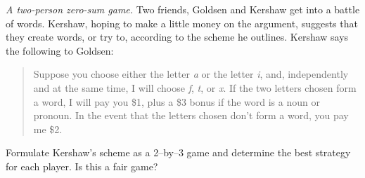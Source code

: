 \item \emph{A two-person zero-sum game.}
Two friends, Goldsen and Kershaw get into a battle of
  words. Kershaw, hoping to make a little money on the argument,
  suggests that they create words, or try to, according to the scheme
  he outlines. Kershaw says the following to Goldsen:

\begin{quote}
Suppose you choose either the letter \emph{a} or the letter
  \emph{i}, and, independently and at the same time, I will choose
  \emph{f}, \emph{t}, or \emph{x}. If the two letters chosen form a
  word, I will pay you \$1, plus a \$3 bonus if the word is a noun or
  pronoun. In the event that the letters chosen don't form a word, you
  pay me \$2.
\end{quote}

Formulate Kershaw's scheme as a 2--by--3 game and determine the best
strategy for each player. Is this a fair game?

